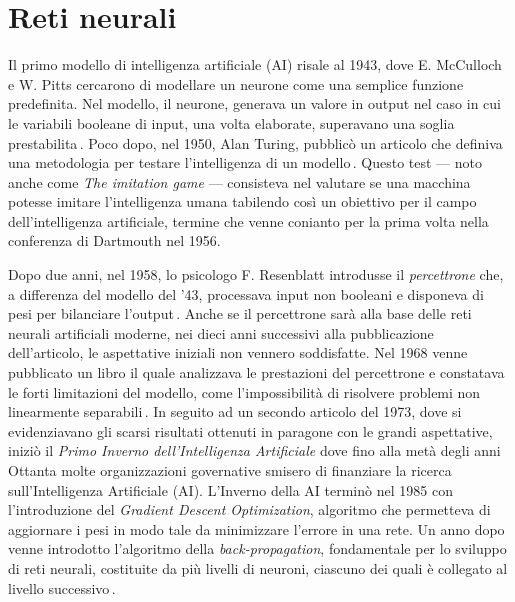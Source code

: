 
\chapter{Reti neurali}\label{chp:neural-networks}
% 
Il primo modello di intelligenza artificiale (\acs{AI}) risale al 1943, dove E. McCulloch e W. Pitts cercarono di modellare un neurone come una semplice funzione predefinita. Nel modello, il neurone, generava un valore in output nel caso in cui le variabili booleane di input, una volta elaborate, superavano una soglia prestabilita\,\cite[``A logical calculus of the ideas immanent in nervous activity'']{mcculloch1943logical}. Poco dopo, nel 1950, Alan Turing, pubblicò un articolo che definiva una metodologia per testare l'intelligenza di un modello\,\cite[``Computing machinery and intelligence'']{turing2009computing}. Questo test — noto anche come \textsl{The imitation game} — consisteva nel valutare se una macchina potesse imitare l'intelligenza umana tabilendo così un obiettivo per il campo dell'intelligenza artificiale, termine che venne conianto per la prima volta nella conferenza di Dartmouth nel 1956.

Dopo due anni, nel 1958, lo psicologo F. Resenblatt introdusse il \textsl{percettrone} che, a differenza del modello del '43, processava input non booleani e disponeva di pesi per bilanciare l'output\,\cite[``The perceptron: a probabilistic model for information storage and organization in the brain.'']{rosenblatt1958perceptron}. Anche se il percettrone sarà alla base delle reti neurali artificiali moderne, nei dieci anni successivi alla pubblicazione dell'articolo, le aspettative iniziali non vennero soddisfatte. Nel 1968 venne pubblicato un libro il quale analizzava le prestazioni del percettrone e constatava le forti limitazioni del modello, come l'impossibilità di risolvere problemi non linearmente separabili\,\cite[``Perceptrons'']{minsky2017perceptrons}. In seguito ad un secondo articolo del 1973, dove si evidenziavano gli scarsi risultati ottenuti in paragone con le grandi aspettative, iniziò il \textsl{Primo Inverno dell'Intelligenza Artificiale} dove fino alla metà degli anni Ottanta molte organizzazioni governative smisero di finanziare la ricerca sull'Intelligenza Artificiale (\acs{AI}). L'Inverno della \acs{AI} terminò nel 1985 con l'introduzione del \textit{Gradient Descent Optimization}, algoritmo che permetteva di aggiornare i pesi in modo tale da minimizzare l'errore in una rete. Un anno dopo venne introdotto l'algoritmo della \textit{back-propagation}, fondamentale per lo sviluppo di reti neurali, costituite da più livelli di neuroni, ciascuno dei quali è collegato al livello successivo\,\cite[``Learning representations by back-propagating errors'']{rumelhart1986learning}.

